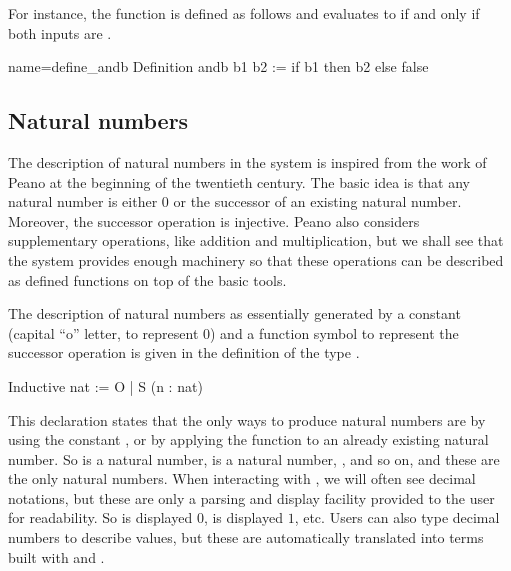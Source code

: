 For instance, the function  is defined as follows and
evaluates to  if and only if both inputs are .

\begin{coq}{name=define_andb}{}
Definition andb b1 b2 := if b1 then b2 else false
\end{coq}


\subsection{Natural numbers}
The description of natural numbers in the \Coq{} system is inspired from
the work of Peano at the beginning of the twentieth century.  The
basic idea is that any natural number is either 0 or the successor of
an existing natural number.  Moreover, the successor operation is
injective.  Peano also considers supplementary operations, like
addition and multiplication, but we shall see that the \Coq{} system
provides enough machinery so that these operations can be described as
defined functions on top of the basic tools.

The description of natural numbers as essentially generated by a
constant  (capital ``o'' letter, to represent $0$) and a function symbol  to represent 
the successor operation is given in the definition of the type
.

\begin{coq}{}{}
Inductive nat := O | S (n : nat)
\end{coq}

This declaration states that the only ways to produce natural numbers
are by using the constant , or by applying the function  to
an already existing natural number.  So  is a natural number,
 is a
natural number, , and so on, and these are the only natural
numbers.  When interacting with \Coq{}, we will often see decimal
notations, but these are only a parsing and display
facility provided to the user for readability.  So  is displayed
$0$,  is displayed $1$, etc.  Users can also type decimal
numbers to describe values, but these are automatically translated into
terms built with  and .

